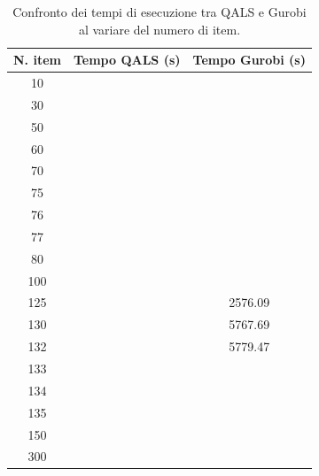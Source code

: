 \begin{table}[H]
    \centering
    \begin{tabular}{ccc}
        \toprule
        \textbf{N. item} & \textbf{Tempo QALS (s)} & \textbf{Tempo Gurobi (s)} \\
        \midrule
        10  &  &  \\
        30  &  &  \\
        50  &  &  \\
        60  &  &  \\
        70  &  &  \\
        75  &  &  \\
        76  &  &  \\
        77  &  &  \\
        80  &  &  \\
        100 &  &  \\
        125 &  & 2576.09 \\
        130 &  & 5767.69 \\
        132 &  & 5779.47 \\
        133 &  &  \\
        134 &  &  \\
        135 &  &  \\
        150 &  &  \\
        300 &  &  \\
        \bottomrule
    \end{tabular}
    \caption{Confronto dei tempi di esecuzione tra QALS e Gurobi al variare del numero di item.}
    \label{tab:qals_vs_gurobi}
\end{table}

